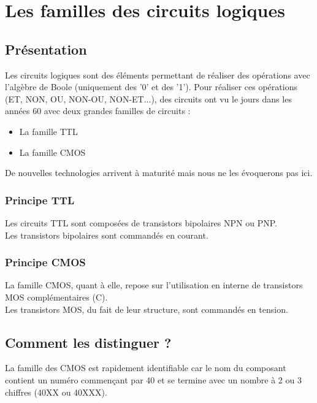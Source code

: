 
\chapter{Les familles des circuits logiques}

\section{Présentation}

Les circuits logiques sont des éléments permettant de réaliser des opérations avec l'algèbre de Boole (uniquement des '0' et des '1').
Pour réaliser ces opérations (ET, NON, OU, NON-OU, NON-ET...), des circuits ont vu le jours dans les années 60 avec deux grandes familles de circuits : \\
\begin{itemize}
    \item La famille TTL
    \item La famille CMOS
\end{itemize} 


De nouvelles technologies arrivent à maturité mais nous ne les évoquerons pas ici.

\subsection{Principe TTL}

Les circuits TTL sont composées de transistors bipolaires NPN ou PNP. \\
Les transistors bipolaires sont commandés en courant.


\subsection{Principe CMOS}

La famille CMOS, quant à elle, repose sur l'utilisation en interne de transistors MOS complémentaires (C). \\
Les transistors MOS, du fait de leur structure, sont commandés en tension.


\section{Comment les distinguer ?}

La famille des CMOS est rapidement identifiable car le nom du composant contient un numéro commençant par 40 et se termine avec un nombre à 2 ou 3 chiffres (40XX ou 40XXX). \\

